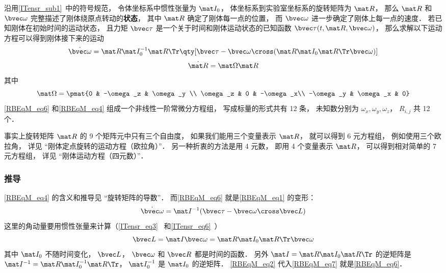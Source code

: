 沿用\autoref{ITensr_sub1}~中的符号规范， 令体坐标系中惯性张量为 $\mat I_0$， 体坐标系到实验室坐标系的旋转矩阵为 $\mat R$， 那么 $\mat R$ 和 $\bvec \omega$ 完整描述了刚体绕原点转动的\textbf{状态}， 其中 $\mat R$ 确定了刚体每一点的位置， 而 $\bvec \omega$ 进一步确定了刚体上每一点的速度． 若已知刚体在初始时间的运动状态， 且力矩 $\bvec \tau$ 是一个关于时间和刚体运动状态的已知函数 $\bvec \tau(t, \mat R, \bvec\omega)$， 那么求解以下运动方程可以得到刚体接下来的运动
\begin{equation}\label{RBEqM_eq6}
\dot{\bvec \omega} = \mat R \mat I_0^{-1} \mat R\Tr \qty[\bvec \tau  - \bvec\omega\cross(\mat R \mat I_0 \mat R\Tr \bvec\omega)]
\end{equation}
\begin{equation}\label{RBEqM_eq4}
\dot{\mat R} = \mat\Omega \mat R
\end{equation}
其中
\begin{equation}\label{RBEqM_eq5}
\mat\Omega = \pmat{0 & -\omega_z & \omega_y \\ \omega_z & 0 & -\omega_x\\ -\omega_y & \omega_x & 0}
\end{equation}
\autoref{RBEqM_eq6} 和\autoref{RBEqM_eq4} 组成一个非线性一阶常微分方程组， 写成标量的形式共有 12 条， 未知数分别为 $\omega_x, \omega_y, \omega_z$， $R_{i,j}$ 共 12 个．

事实上旋转矩阵 $\mat R$ 的 9 个矩阵元中只有三个自由度， 如果我们能用三个变量表示 $\mat R$， 就可以得到 6 元方程组， 例如使用三个欧拉角， 详见 “刚体定点旋转的运动方程（欧拉角）”． 另一种折衷的方法是用 4 元数， 即用 4 个变量表示 $\mat R$， 可以得到相对简单的 7 元方程组， 详见 “刚体运动方程（四元数）”．

\subsubsection{推导}

\autoref{RBEqM_eq4} 的含义和推导见 “旋转矩阵的导数”． 而\autoref{RBEqM_eq6} 就是\autoref{RBEqM_eq1} 的变形：
\begin{equation}\label{RBEqM_eq7}
\dot{\bvec \omega} = \mat I^{-1} (\bvec\tau - \bvec\omega\cross\bvec L)
\end{equation}
这里的角动量要用惯性张量来计算（\autoref{ITensr_eq3}~ 和\autoref{ITensr_eq6}~）
\begin{equation}\label{RBEqM_eq2}
\bvec L = \mat I \bvec \omega = \mat R \mat I_0 \mat R\Tr \bvec \omega
\end{equation}
其中 $\mat I_0$ 不随时间变化， $\bvec L$， $\bvec \omega$ 和 $\bvec R$ 都是时间的函数． 另外 $\mat I = \mat R \mat I_0 \mat R\Tr$ 的逆矩阵是 $\mat I^{-1} = \mat R \mat I_0^{-1} \mat R\Tr$， $\mat I_0^{-1}$ 是 $\mat I_0$ 的逆矩阵． \autoref{RBEqM_eq2} 代入\autoref{RBEqM_eq7} 就是\autoref{RBEqM_eq6}．

